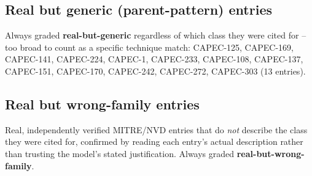 \documentclass[10pt,twocolumn]{article}
\begin{document}
\subsection{Real but generic (parent-pattern) entries}

Always graded \textbf{real-but-generic} regardless of which class they were cited for -- too broad to count as a specific technique match: CAPEC-125, CAPEC-169, CAPEC-141, CAPEC-224, CAPEC-1, CAPEC-233, CAPEC-108, CAPEC-137, CAPEC-151, CAPEC-170, CAPEC-242, CAPEC-272, CAPEC-303 (13 entries).

\subsection{Real but wrong-family entries}

Real, independently verified MITRE/NVD entries that do \emph{not} describe the class they were cited for, confirmed by reading each entry's actual description rather than trusting the model's stated justification. Always graded \textbf{real-but-wrong-family}.
\end{document}

